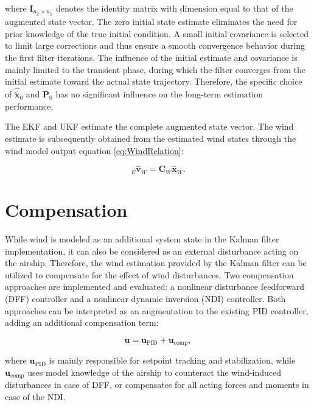 where $\bm{I}_{n_{\tilde{x}} \times n_{\tilde{x}}}$ denotes the identity matrix with dimension equal to that of the augmented state vector. The zero initial state estimate eliminates the need for prior knowledge of the true initial condition. A small initial covariance is selected to limit large corrections and thus ensure a smooth convergence behavior during the first filter iterations. The influence of the initial estimate and covariance is mainly limited to the transient phase, during which the filter converges from the initial estimate toward the actual state trajectory. Therefore, the specific choice of $\hat{\tilde{\bm{x}}}_0$ and $\bm{P}_0$ has no significant influence on the long-term estimation performance.

The EKF and UKF estimate the complete augmented state vector.
The wind estimate is subsequently obtained from the estimated wind states through the wind model output equation \eqref{eq:WindRelation}:

\begin{equation}
	\boxed{{}_E \hat{\bm{v}}_W = \bm{C}_W \hat{\bm{x}}_W.}
\end{equation}





\section{Compensation}
\label{sec:3.2Compensation}

While wind is modeled as an additional system state in the Kalman filter implementation, it can also be considered as an external disturbance acting on the airship. Therefore, the wind estimation provided by the Kalman filter can be utilized to compensate for the effect of wind disturbances.
Two compensation approaches are implemented and evaluated: a nonlinear disturbance feedforward (DFF) controller and a nonlinear dynamic inversion (NDI) controller. Both approaches can be interpreted as an augmentation to the existing PID controller, adding an additional compensation term:

\begin{equation}
	\bm{u} = \bm{u}_{\text{PID}} + \bm{u}_{\text{comp}},
	\label{eq:compensation_u}
\end{equation}

where $\bm{u}_{\text{PID}}$ is mainly responsible for setpoint tracking and stabilization, while $\bm{u}_{\text{comp}}$ uses model knowledge of the airship to counteract the wind-induced disturbances in case of DFF, or compensates for all acting forces and moments in case of the NDI.

